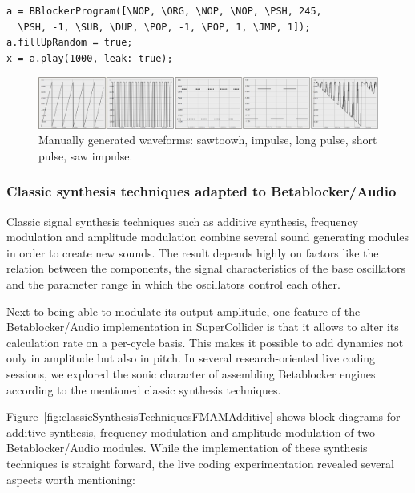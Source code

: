 \documentclass[letterpaper, 12pt]{article}
\begin{document}
\begin{Verbatim}[fontfamily=courier, xleftmargin=\parindent]
a = BBlockerProgram([\NOP, \ORG, \NOP, \NOP, \PSH, 245,
  \PSH, -1, \SUB, \DUP, \POP, -1, \POP, 1, \JMP, 1]);
a.fillUpRandom = true;
x = a.play(1000, leak: true);
\end{Verbatim}

\begin{figure}
	\centering
		\includegraphics[width=\columnwidth]{wv-allwaves}

	\caption{Manually generated waveforms: sawtoowh, impulse, long pulse, short pulse, saw impulse.}
	\label{fig:fig_waveforms_POPdestroy-random}
\end{figure}
\parskip 18pt

\subsubsection{Classic synthesis techniques adapted to Betablocker/Audio} %
\label{sub:classic_synthesis_techniques_adapted_to_betablocker}

Classic signal synthesis techniques such as additive synthesis, frequency modulation and amplitude modulation combine several sound generating modules in order to create new sounds.
The result depends highly on factors like the relation between the components, the signal characteristics of the base oscillators and the parameter range in which the oscillators control each other.

Next to being able to modulate its output amplitude, one feature of the Betablocker/Audio implementation in SuperCollider is that it allows to alter its calculation rate on a per-cycle basis.
This makes it possible to add dynamics not only in amplitude but also in pitch.
In several research-oriented live coding sessions, we explored the sonic character of assembling Betablocker engines according to the mentioned classic synthesis techniques.

Figure~\ref{fig:classicSynthesisTechniquesFMAMAdditive} shows block diagrams for additive synthesis, frequency modulation and amplitude modulation of two Betablocker/Audio modules.
While the implementation of these synthesis techniques is straight forward, the live coding experimentation revealed several aspects worth mentioning:
\end{document}
